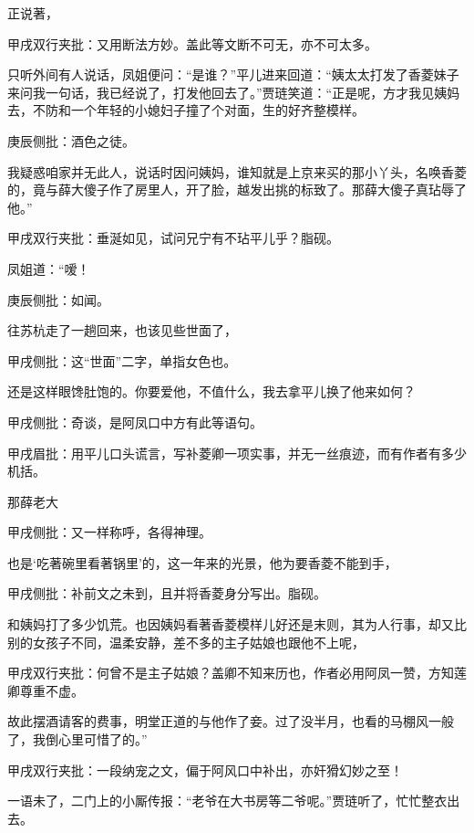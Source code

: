 \begin{parag}


    正说著，\begin{note}甲戌双行夹批：又用断法方妙。盖此等文断不可无，亦不可太多。\end{note}只听外间有人说话，凤姐便问：“是谁？”平儿进来回道：“姨太太打发了香菱妹子来问我一句话，我已经说了，打发他回去了。”贾琏笑道：“正是呢，方才我见姨妈去，不防和一个年轻的小媳妇子撞了个对面，生的好齐整模样。\begin{note}庚辰侧批：酒色之徒。\end{note}我疑惑咱家并无此人，说话时因问姨妈，谁知就是上京来买的那小丫头，名唤香菱的，竟与薛大傻子作了房里人，开了脸，越发出挑的标致了。那薛大傻子真玷辱了他。”\begin{note}甲戌双行夹批：垂涎如见，试问兄宁有不玷平儿乎？脂砚。\end{note}凤姐道：“嗳！\begin{note}庚辰侧批：如闻。\end{note}往苏杭走了一趟回来，也该见些世面了，\begin{note}甲戌侧批：这“世面”二字，单指女色也。\end{note}还是这样眼馋肚饱的。你要爱他，不值什么，我去拿平儿换了他来如何？\begin{note}甲戌侧批：奇谈，是阿凤口中方有此等语句。\end{note}\begin{note}甲戌眉批：用平儿口头谎言，写补菱卿一项实事，并无一丝痕迹，而有作者有多少机括。\end{note}那薛老大\begin{note}甲戌侧批：又一样称呼，各得神理。\end{note}也是‘吃著碗里看著锅里’的，这一年来的光景，他为要香菱不能到手，\begin{note}甲戌侧批：补前文之未到，且并将香菱身分写出。脂砚。\end{note}和姨妈打了多少饥荒。也因姨妈看著香菱模样儿好还是末则，其为人行事，却又比别的女孩子不同，温柔安静，差不多的主子姑娘也跟他不上呢，\begin{note}甲戌双行夹批：何曾不是主子姑娘？盖卿不知来历也，作者必用阿凤一赞，方知莲卿尊重不虚。\end{note}故此摆酒请客的费事，明堂正道的与他作了妾。过了没半月，也看的马棚风一般了，我倒心里可惜了的。”\begin{note}甲戌双行夹批：一段纳宠之文，偏于阿风口中补出，亦奸猾幻妙之至！\end{note}一语未了，二门上的小厮传报：“老爷在大书房等二爷呢。”贾琏听了，忙忙整衣出去。
\end{parag}


